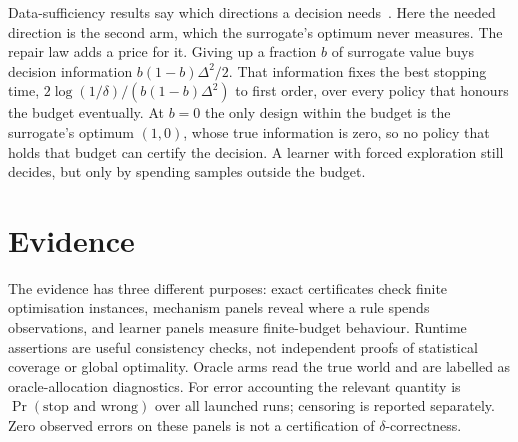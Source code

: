 Data-sufficiency results say which directions a decision needs~\cite{bennouna2025}. Here the
needed direction is the second arm, which the surrogate's optimum never measures. The repair
law adds a price for it. Giving up a fraction $b$ of surrogate value buys decision information
$b(1-b)\Delta^2/2$. That information fixes the best stopping time,
$2\log(1/\delta)/(b(1-b)\Delta^2)$ to first order, over every policy that honours the budget
eventually. At $b=0$ the only design within the budget is the surrogate's optimum $(1,0)$, whose
true information is zero, so no policy that holds that budget can certify the decision. A
learner with forced exploration still decides, but only by spending samples outside the budget.

\section{Evidence}
\label{sec:evidence}

The evidence has three different purposes: exact certificates check finite optimisation
instances, mechanism panels reveal where a rule spends observations, and learner panels measure
finite-budget behaviour. Runtime assertions are useful consistency checks, not independent
proofs of statistical coverage or global optimality. Oracle arms read the true world and are
labelled as oracle-allocation diagnostics. For error accounting the relevant quantity is
$\Pr(\text{stop and wrong})$ over all launched runs; censoring is reported separately.
Zero observed errors on these panels is not a certification of $\delta$-correctness.

